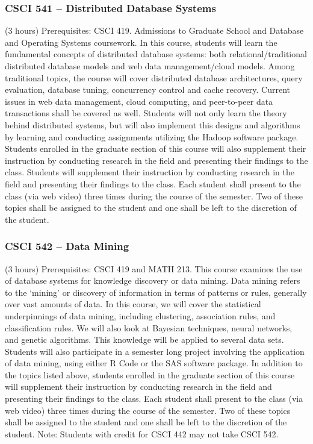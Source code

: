 \subsubsection{CSCI 541 -- Distributed Database Systems}%
\label{course:CSCI:541}
(3 hours) Prerequisites: CSCI 419.  Admissions to Graduate School and Database and Operating Systems coursework.   In this course, students will learn the fundamental concepts of distributed database systems: both relational/traditional distributed database models and web data management/cloud models. Among traditional topics, the course will cover distributed database architectures, query evaluation, database tuning, concurrency control and cache recovery. Current issues in web data management, cloud computing, and peer-to-peer data transactions shall be covered as well. Students will not only learn the theory behind distributed systems, but will also implement this designs and algorithms by learning and conducting assignments utilizing the Hadoop software package. Students enrolled in the graduate section of this course will also supplement their instruction by conducting research in the field and presenting their findings to the class. Students will supplement their instruction by conducting research in the field and presenting their findings to the class. Each student shall present to the class (via web video) three times during the course of the semester. Two of these topics shall be assigned to the student and one shall be left to the discretion of the student. 

\subsubsection{CSCI 542 -- Data Mining}%
\label{course:CSCI:542}
(3 hours) Prerequisites: CSCI 419 and MATH 213. This course examines the use of database systems for knowledge discovery or data mining. Data mining refers to the ‘mining’ or discovery of information in terms of patterns or rules, generally over vast amounts of data. In this course, we will cover the statistical underpinnings of data mining, including clustering, association rules, and classification rules. We will also look at Bayesian techniques, neural networks, and genetic algorithms. This knowledge will be applied to several data sets. Students will also participate in a semester long project involving the application of data mining, using either R Code or the SAS software package. In addition to the topics listed above, students enrolled in the graduate section of this course will supplement their instruction by conducting research in the field and presenting their findings to the class. Each student shall present to the class (via web video) three times during the course of the semester. Two of these topics shall be assigned to the student and one shall be left to the discretion of the student. Note: Students with credit for CSCI 442 may not take CSCI 542.

